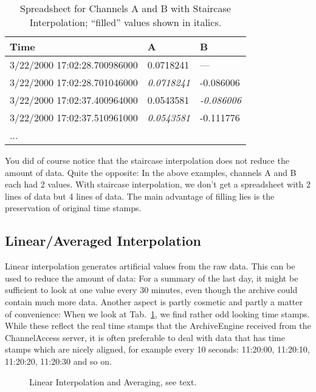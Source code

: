 \begin{table}[htbp]
  \begin{center}
    \sffamily
    \begin{tabular}[t]{l|l|l}
      Time                         & A         & B         \\
      \hline
      3/22/2000 17:02:28.700986000 & 0.0718241 & ---       \\
      3/22/2000 17:02:28.701046000 & \textit{0.0718241}      & -0.086006 \\
      3/22/2000 17:02:37.400964000 & 0.0543581 & \textit{-0.086006} \\
      3/22/2000 17:02:37.510961000 & \textit{0.0543581} & -0.111776 \\
      ...
    \end{tabular}
    \caption{Spreadsheet for Channels A and B with Staircase
      Interpolation; ``filled'' values shown in italics.}
    \label{tab:ABstair}
  \end{center}
\end{table}

You did of course notice that the staircase interpolation does not
reduce the amount of data. Quite the opposite: In the above examples,
channels A and B each had 2 values. With staircase interpolation, we
don't get a spreadsheet with 2 lines of data but 4 lines of data.  The
main advantage of filling lies is the preservation of original time stamps.

\subsection{Linear/Averaged Interpolation}  \label{sec:lininterpol}
Linear interpolation generates artificial values from the raw
data. This can be used to reduce the amount of data: For a summary of
the last day, it might be sufficient to look at one value every 30
minutes, even though the archive could contain much more data.
Another aspect is partly cosmetic and partly a matter of convenience:
When we look at Tab.~\ref{tab:ABstair}, we find rather odd looking
time stamps. While these reflect the real time stamps that the
ArchiveEngine received from the ChannelAccess server, it is often
preferable to deal with data that has time stamps which are nicely
aligned, for example every 10 seconds: 11:20:00, 11:20:10, 11:20:20,
11:20:30 and so on.

\begin{figure}[htb]
\begin{center}
\medskip
{}
\end{center}
\caption{\label{fig:interpol}Linear Interpolation and Averaging, see text.}
\end{figure}

